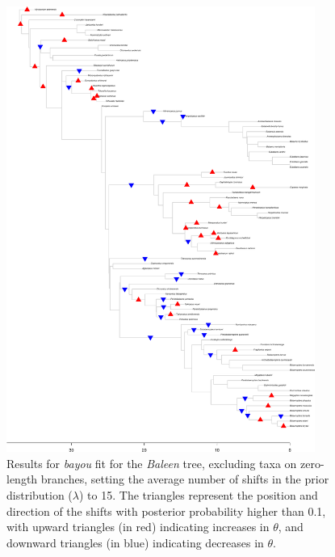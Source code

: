 \begin{figure}[H]
\includegraphics[width=0.9\textwidth]{img/plots-baleen-k15-1.pdf}
\caption{Results for \textit{bayou} fit for the \textit{Baleen} tree, excluding taxa on zero-length branches, setting the average number of shifts in the prior distribution ($\lambda$) to 15. The triangles represent the position and direction of the shifts with posterior probability higher than 0.1, with upward triangles (in red) indicating increases in $\theta$, and downward triangles (in blue) indicating decreases in $\theta$.}
\label{fig:baleen-k15-nzlb}
\end{figure}

\newpage


